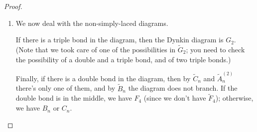 \begin{proof}
\begin{enumerate}
    \begin{exercise}
    Finish the proof in one of two ways:
    \end{exercise}
  \item We now deal with the non-simply-laced diagrams.

    \begin{exercise}
    If there is a triple bond in the diagram, then the Dynkin diagram is
    $G_2$. (Note that we took care of one of the possibilities in
    $\tilde G_2$; you need to check the possibility of a double and a triple
    bond, and of two triple bonds.)
    \end{exercise}

    Finally, if there is a double bond in the diagram, then by $\tilde C_n$
    and $\tilde A_n^{(2)}$ there's only one of them, and by $\tilde B_n$ the
    diagram does not branch. If the double bond is in the middle, we have
    $F_4$ (since we don't have $\tilde F_4$); otherwise, we have $B_n$ or
    $C_n$. \qedhere
\end{enumerate}
\end{proof}

